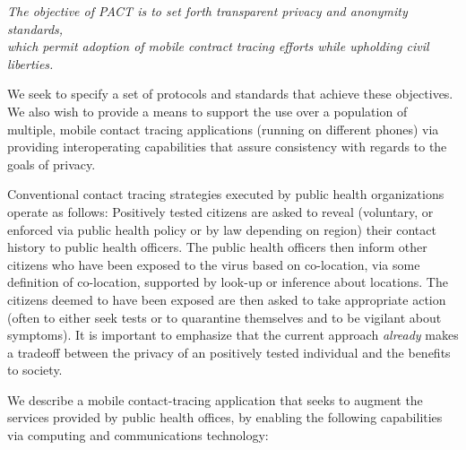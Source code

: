 \documentclass{article}
\begin{document}
\begin{center}
\emph{The objective of PACT is to set forth transparent privacy and
  anonymity standards,\\
  which permit adoption of mobile contract tracing efforts while upholding civil liberties.}
\end{center}

We seek to specify a set of protocols and standards that achieve
these objectives. We also wish to provide a means to support the use over a population of multiple, mobile contact tracing applications (running on different phones) via providing interoperating capabilities that assure consistency with regards to the goals of privacy. 

Conventional contact tracing strategies executed by public health organizations operate as follows: Positively tested citizens are asked to reveal (voluntary, or enforced via public health policy or by law depending on region) their contact history to public health officers. The public health officers then inform other citizens who have been exposed to the virus based on co-location, via some definition of co-location, supported by look-up or inference about locations. The citizens deemed to have been exposed are then asked to take appropriate action (often to either seek tests or to quarantine
themselves and to be vigilant about symptoms).  It is important to emphasize that the current approach \emph{already} makes a tradeoff between the privacy of an positively tested individual and the benefits to society.

We describe a mobile contact-tracing application that seeks to augment the services provided by public health offices, by enabling the following capabilities via computing and communications technology:
\end{document}
